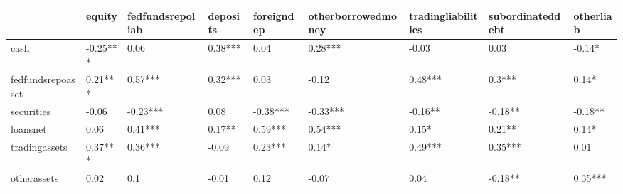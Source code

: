 \begin{tabular}{lllllllll}
\toprule
{} &    equity & fedfundsrepoliab & deposits & foreigndep & otherborrowedmoney & tradingliabilities & subordinateddebt & otherliab \\
\midrule
cash              &  -0.25*** &             0.06 &  0.38*** &       0.04 &            0.28*** &              -0.03 &             0.03 &    -0.14* \\
fedfundsrepoasset &   0.21*** &          0.57*** &  0.32*** &       0.03 &              -0.12 &            0.48*** &           0.3*** &     0.14* \\
securities        &     -0.06 &         -0.23*** &     0.08 &   -0.38*** &           -0.33*** &            -0.16** &          -0.18** &   -0.18** \\
loansnet          &      0.06 &          0.41*** &   0.17** &    0.59*** &            0.54*** &              0.15* &           0.21** &     0.14* \\
tradingassets     &   0.37*** &          0.36*** &    -0.09 &    0.23*** &              0.14* &            0.49*** &          0.35*** &      0.01 \\
otherassets       &      0.02 &              0.1 &    -0.01 &       0.12 &              -0.07 &               0.04 &          -0.18** &   0.35*** \\
\bottomrule
\end{tabular}
